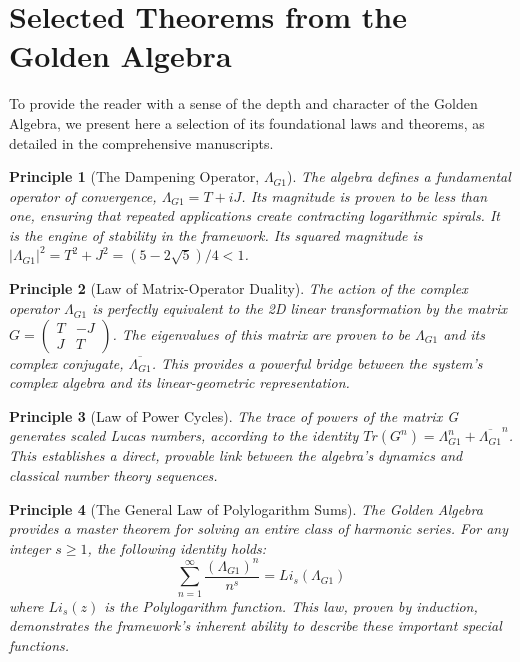 \documentclass{article}
\theoremstyle{plain}
\newtheorem{principle}{Principle}[section]
\theoremstyle{definition}
\theoremstyle{remark}
\begin{document}
\appendix
\section{Selected Theorems from the Golden Algebra}

To provide the reader with a sense of the depth and character of the Golden Algebra, we present here a selection of its foundational laws and theorems, as detailed in the comprehensive manuscripts.

\begin{principle}[The Dampening Operator, $\Lambda_{G1}$]
The algebra defines a fundamental operator of convergence, $\Lambda_{G1} = T+iJ$. Its magnitude is proven to be less than one, ensuring that repeated applications create contracting logarithmic spirals. It is the engine of stability in the framework. Its squared magnitude is $|\Lambda_{G1}|^2 = T^2+J^2 = (5-2\sqrt{5})/4 < 1$.
\end{principle}

\begin{principle}[Law of Matrix-Operator Duality]
The action of the complex operator $\Lambda_{G1}$ is perfectly equivalent to the 2D linear transformation by the matrix $G = \begin{pmatrix} T & -J \\ J & T \end{pmatrix}$. The eigenvalues of this matrix are proven to be $\Lambda_{G1}$ and its complex conjugate, $\overline{\Lambda_{G1}}$. This provides a powerful bridge between the system's complex algebra and its linear-geometric representation.
\end{principle}

\begin{principle}[Law of Power Cycles]
The trace of powers of the matrix G generates scaled Lucas numbers, according to the identity $Tr(G^n) = \Lambda_{G1}^n + \overline{\Lambda_{G1}}^n$. This establishes a direct, provable link between the algebra's dynamics and classical number theory sequences.
\end{principle}

\begin{principle}[The General Law of Polylogarithm Sums]
The Golden Algebra provides a master theorem for solving an entire class of harmonic series. For any integer $s \ge 1$, the following identity holds:
$$ \sum_{n=1}^{\infty} \frac{(\Lambda_{G1})^n}{n^s} = Li_s(\Lambda_{G1}) $$
where $Li_s(z)$ is the Polylogarithm function. This law, proven by induction, demonstrates the framework's inherent ability to describe these important special functions.
\end{principle}
\end{document}
